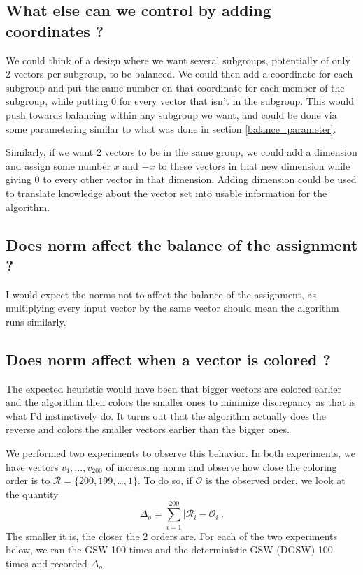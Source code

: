 \documentclass[12pt]{article}
\begin{document}
\subsection{What else can we control by adding coordinates ?}
We could think of a design where we want several subgroups, potentially of only 2 vectors per subgroup, to be balanced. We could then add a coordinate for each subgroup and put the same number on that coordinate for each member of the subgroup, while putting 0 for every vector that isn't in the subgroup. This would push towards balancing within any subgroup we want, and could be done via some parametering similar to what was done in section \ref{balance_parameter}. 

Similarly, if we want 2 vectors to be in the same group, we could add a dimension and assign some number $x$ and $-x$ to these vectors in that new dimension while giving 0 to every other vector in that dimension. Adding dimension could be used to translate knowledge about the vector set into usable information for the algorithm.



\subsection{Does norm affect the balance of the assignment ?}
I would expect the norms not to affect the balance of the assignment, as multiplying every input vector by the same vector should mean the algorithm runs similarly.

\subsection{Does norm affect when a vector is colored ?}\label{norm_affect_when}
The expected heuristic would have been that bigger vectors are colored earlier and the algorithm then colors the smaller ones to minimize discrepancy as that is what I'd instinctively do. It turns out that the algorithm actually does the reverse and colors the smaller vectors earlier than the bigger ones.

We performed two experiments to observe this behavior. In both experiments, we have vectors $v_1,\dots,v_{200}$ of increasing norm and observe how close the coloring order is to $\mathcal{R}=\{200,199,$\dots$,1\}$. To do so, if $\mathcal{O}$ is the observed order, we look at the quantity 
\begin{equation}
\Delta_{o}=\sum_{i=1}^{200}|\mathcal{R}_i-\mathcal{O}_i|.
\label{orderdistance}
\end{equation}
The smaller it is, the closer the 2 orders are. For each of the two experiments below, we ran the GSW 100 times and the deterministic GSW (DGSW) 100 times and recorded $\Delta_o$.
\end{document}

